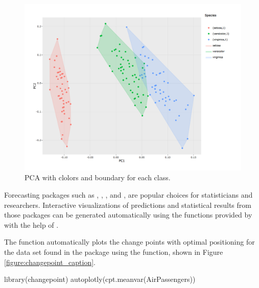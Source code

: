 \begin{figure}[htbp]
  \centering
  \includegraphics[width=145mm,scale=0.8]{images/iris_pca_full.png}
  \caption{PCA with clolors and boundary for each class.}
  \label{figure:pca_full}
\end{figure}

Forecasting packages such as  \citep{forecast},
 \citep{changepoint}, 
\citep{strucchange}, and  \citep{dlm}, are popular choices
for statisticians and researchers. Interactive visualizations of
predictions and statistical results from those packages can be generated
automatically using the functions provided by  with the
help of .

The  function automatically plots the change points with
optimal positioning for the  data set found in the
 package using the  function, shown
in Figure \ref{figure:changepoint_caption}.

\begin{Schunk}
\begin{Sinput}
library(changepoint)
autoplotly(cpt.meanvar(AirPassengers))
\end{Sinput}
\end{Schunk}

